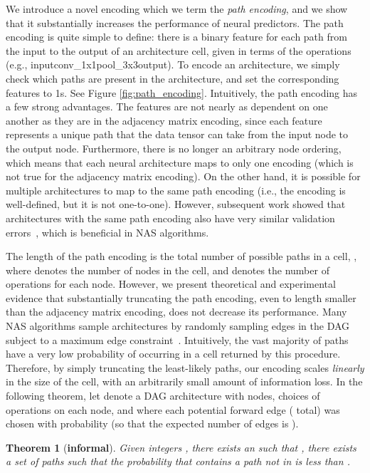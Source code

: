 \documentclass[11pt]{article}
\numberwithin{equation}{section}
\numberwithin{figure}{section}
\theoremstyle{plain}
\newtheorem{theorem}{Theorem}[section]
\theoremstyle{definition}
\begin{document}
We introduce a novel encoding which we term the \emph{path encoding},
and we show that it substantially increases the performance of neural predictors.
The path encoding is quite simple to define: there is a binary feature for each
path from the input to the output of an architecture cell,
given in terms of the operations
(e.g., inputconv\_1x1pool\_3x3output). 
To encode an architecture, we simply check which paths are present in the architecture,
and set the corresponding features to 1s.
See Figure \ref{fig:path_encoding}.
Intuitively, the path encoding has a few strong advantages.
The features are not nearly as dependent on one another as they are in the adjacency
matrix encoding, since each feature represents a unique path that the data tensor can
take from the input node to the output node.
Furthermore, there is no longer an arbitrary node ordering, which means that
each neural architecture maps to only one encoding (which is not true for the
adjacency matrix encoding). On the other hand, it is possible for multiple
architectures to map to the same path encoding
(i.e., the encoding is well-defined, but it is not one-to-one).
However, subsequent work showed that architectures
with the same path encoding also have very similar validation 
errors~\cite{white2020study}, which is beneficial in NAS algorithms.

The length of the path encoding is the total number of possible paths in a cell,
, where  denotes
the number of nodes in the cell, and  denotes the number
of operations for each node. 
However, we present theoretical and experimental evidence that substantially
truncating the path encoding, even to length smaller than the adjacency matrix encoding,
does not decrease its performance.
Many NAS algorithms sample architectures by randomly sampling edges in the DAG 
subject to a maximum edge constraint~\cite{nasbench}.
Intuitively, the vast majority of paths have a very low probability of occurring
in a cell returned by this procedure.
Therefore, by simply truncating the least-likely paths,
our encoding scales \emph{linearly} in the size of the cell,
with an arbitrarily small amount of information loss.
In the following theorem, let  denote a DAG architecture with  nodes,
 choices of operations on each node, and where each potential forward edge 
( total) was chosen with probability  
(so that the expected number of edges is ).

\begin{theorem}[\textbf{informal}] \label{thm:path_length_informal}
Given integers , there exists an  such that
, there exists a set of  paths 
such that the probability that  contains
a path not in  is less than .
\end{theorem}
\end{document}
